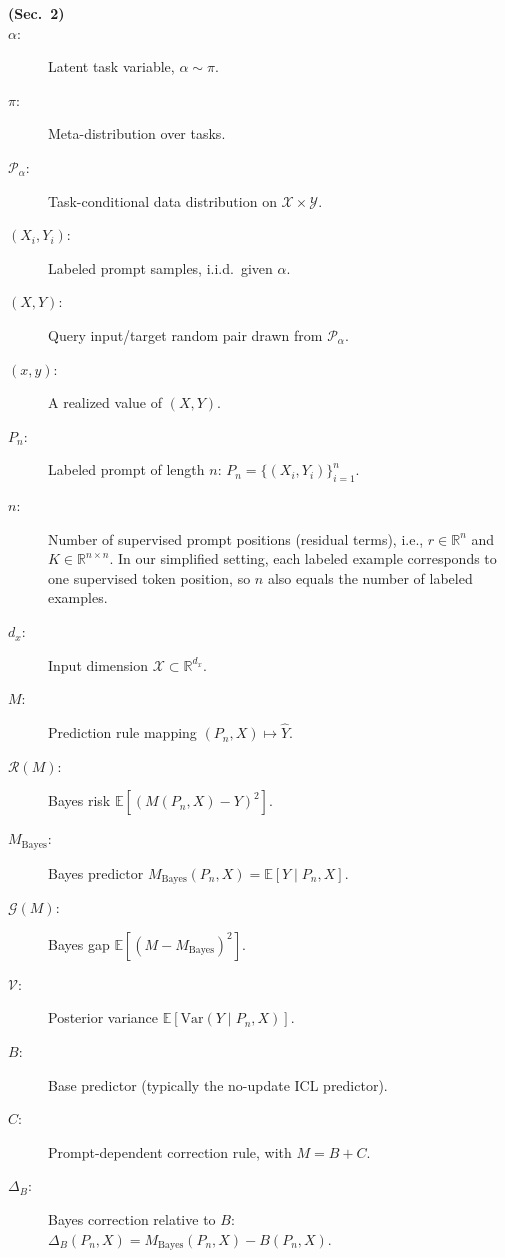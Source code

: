 \documentclass{article}
\theoremstyle{plain}
\theoremstyle{definition}
\theoremstyle{remark}
\begin{document}
\begin{description}

\item[\textbf{(Sec.~2) }]
\item[$\alpha$:] Latent task variable, $\alpha\sim\pi$.
\item[$\pi$:] Meta-distribution over tasks.
\item[$\mathcal P_\alpha$:] Task-conditional data distribution on $\mathcal X\times\mathcal Y$.
\item[$(X_i,Y_i)$:] Labeled prompt samples, i.i.d.\ given $\alpha$.
\item[$(X,Y)$:] Query input/target random pair drawn from $\mathcal P_\alpha$.
\item[$(x,y)$:] A realized value of $(X,Y)$.
\item[$P_n$:] Labeled prompt of length $n$: $P_n=\{(X_i,Y_i)\}_{i=1}^n$.
\item[$n$:] Number of supervised prompt positions (residual terms), i.e., $r\in\mathbb R^n$ and $K\in\mathbb R^{n\times n}$.
In our simplified setting, each labeled example corresponds to one supervised token position, so $n$ also equals the number of labeled examples.

\item[$d_x$:] Input dimension $\mathcal X\subset\mathbb R^{d_x}$.

\item[$M$:] Prediction rule mapping $(P_n,X)\mapsto \widehat Y$.
\item[$\mathcal R(M)$:] Bayes risk $\mathbb E[(M(P_n,X)-Y)^2]$.
\item[$M_{\mathrm{Bayes}}$:] Bayes predictor $M_{\mathrm{Bayes}}(P_n,X)=\mathbb E[Y\mid P_n,X]$.
\item[$\mathcal G(M)$:] Bayes gap $\mathbb E[(M-M_{\mathrm{Bayes}})^2]$.
\item[$\mathcal V$:] Posterior variance $\mathbb E[\mathrm{Var}(Y\mid P_n,X)]$.

\item[$B$:] Base predictor (typically the no-update ICL predictor).
\item[$C$:] Prompt-dependent correction rule, with $M=B+C$.
\item[$\Delta_B$:] Bayes correction relative to $B$:
$\Delta_B(P_n,X)=M_{\mathrm{Bayes}}(P_n,X)-B(P_n,X)$.


\end{description}
\end{document}
